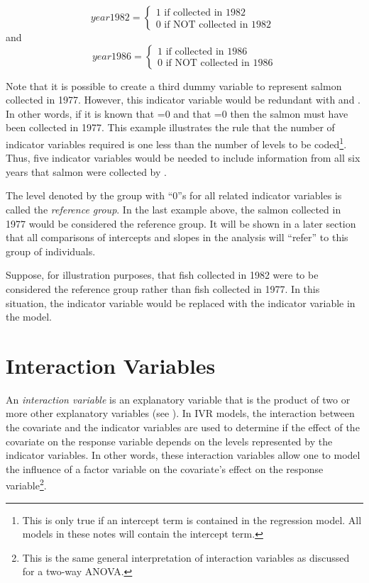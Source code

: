\documentclass[10pt,openany]{book}\usepackage[]{graphicx}\usepackage[]{color}
\begin{document}
\[
  year1982 = \left\{\begin{array}{l}
  1 \text{ if collected in 1982 }\\
  0 \text{ if NOT collected in 1982 }
  \end{array}  \right.
\]
and
\[
  year1986 = \left\{\begin{array}{l}
  1 \text{ if collected in 1986 }\\
  0 \text{ if NOT collected in 1986}
  \end{array}  \right.
\]

Note that it is possible to create a third dummy variable to represent salmon collected in 1977.  However, this indicator variable would be redundant with  and .  In other words, if it is known that =0 and that =0 then the salmon must have been collected in 1977.  This example illustrates the rule that the number of indicator variables required is one less than the number of levels to be coded\footnote{This is only true if an intercept term is contained in the regression model.  All models in these notes will contain the intercept term.}.  Thus, five indicator variables would be needed to include information from all six years that salmon were collected by \cite{Makarewicz2003}.


The level denoted by the group with ``0''s for all related indicator variables is called the \emph{reference group}.  In the last example above, the salmon collected in 1977 would be considered the reference group.  It will be shown in a later section that all comparisons of intercepts and slopes in the analysis will ``refer'' to this group of individuals.


Suppose, for illustration purposes, that fish collected in 1982 were to be considered the reference group rather than fish collected in 1977.  In this situation, the  indicator variable would be replaced with the  indicator variable in the model.



\section{Interaction Variables}
An \emph{interaction variable} is an explanatory variable that is the product of two or more other explanatory variables (see ).  In IVR models, the interaction between the covariate and the indicator variables are used to determine if the effect of the covariate on the response variable depends on the levels represented by the indicator variables.  In other words, these interaction variables allow one to model the influence of a factor variable on the covariate's effect on the response variable\footnote{This is the same general interpretation of interaction variables as discussed for a two-way ANOVA.}.
\end{document}
